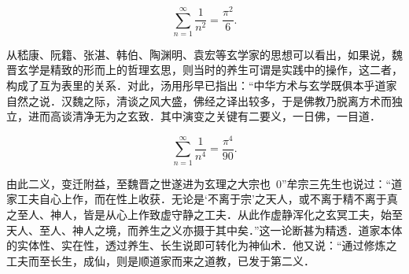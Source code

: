 \begin{equation}\label{key}
\sum_{n=1}^{\infty} \dfrac{1}{n^2} = \dfrac{\pi^2}{6}.
\end{equation}

从嵇康、阮籍、张湛、韩伯、陶渊明、袁宏等玄学家的思想可以看出，如果说，魏晋玄学是精致的形而上的哲理玄思，则当时的养生可谓是实践中的操作，这二者，构成了互为表里的关系．对此，汤用彤早已指出：“中华方术与玄学既俱本乎道家自然之说．汉魏之际，清谈之风大盛，佛经之译出较多，于是佛教乃脱离方术而独立，进而高谈清净无为之玄致．其中演变之关键有二要义，一日佛，一目道．

\begin{equation}\label{key}
\sum_{n=1}^{\infty} \dfrac{1}{n^4} = \dfrac{\pi^4}{90}.
\end{equation}




由此二义，变迁附益，至魏晋之世遂进为玄理之大宗也~0”牟宗三先生也说过：“道家工夫自心上作，而在性上收获．无论是‘不离于宗’之天人，或不离于精不离于真之至人、神人，皆是从心上作致虚守静之工夫．从此作虚静浑化之玄冥工夫，始至天人、至人、神人之境，而养生之义亦摄于其中矣．”这一论断甚为精透．道家本体的实体性、实在性，透过养生、长生说即可转化为神仙术．他又说：“通过修炼之工夫而至长生，成仙，则是顺道家而来之道教，已发于第二义．